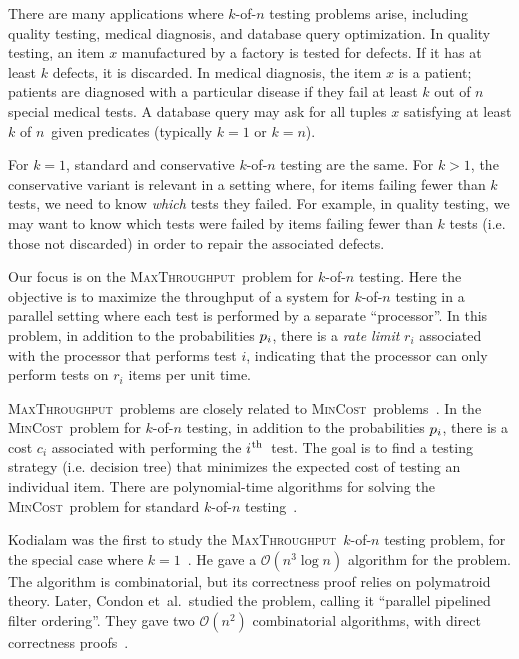 \documentclass{article}
\newcounter{ass}
\newcommand{\ens}[1]{\ensuremath{#1}}					\newcommand{\card}[1]{\ens{|#1|}}							\newcommand{\dotlist}[2]{\ens{#1,\ldots,#2}}
\newcommand{\bigoh}[1]{\ens{\mathcal{O}(#1)}}				\newcommand{\bigom}[1]{\ens{\Omega(#1)}}
\newcommand{\ith}{\ens{i^{\mbox{\hspace{.2mm}\scriptsize th}}}}
\newcommand{\anitem}{\ens{x}}
\newcommand{\valn}{\ens{n}}
\newcommand{\valk}{\ens{k}}
\newcommand{\maxthru}{\textsc{MaxThroughput}}
\newcommand{\mincost}{\textsc{MinCost}}
\newcommand{\kofn}{\valk-of-\valn}
\newcommand{\strategy}{\ens{T}}
\newcommand{\processor}{processor}
\newcommand{\test}[1]{\ens{#1}}										\newcommand{\cost}[1]{\ens{c_{#1}}}								\newcommand{\rate}[1]{\ens{r_{#1}}}								\newcommand{\resrate}[1]{\ens{r'_{#1}}}							\newcommand{\landprob}[2]{\ens{g(#1,#2)}}					\newcommand{\cstrat}[2]{\ens{\strategy^c_{#1}(#2)}}				\newcommand{\sstrat}[2]{\ens{\strategy^s_{#1}(#2)}}				\newcommand{\varz}[1]{\ens{z_{#1}}}								\newcommand{\vary}[1]{\ens{y_{#1}}}
\begin{document}
There are many applications where \kofn{} testing problems
arise, including 
quality testing, medical diagnosis, and database query optimization.
In quality testing, an item \anitem{} manufactured by a factory is tested for defects.  If it has at least $\valk$ defects, it is discarded.  
In medical diagnosis, the item \anitem{} is a patient;
patients are diagnosed with a particular disease if they fail at least
$k$ out of $n$ special medical tests. 
A database query may ask 
for all tuples \anitem{} satisfying at least $\valk$ of \valn\ given predicates (typically $\valk=1$ or $\valk=\valn$).

For $\valk=1$, standard and conservative \kofn{} testing
are the same.
For $\valk>1$, the conservative variant is relevant
in a setting where, for items failing fewer than $\valk$ tests,
we need to know {\em which} tests they failed. 
For example, in quality testing, we may want to know which tests
were failed by items failing fewer than 
$\valk$ tests (i.e. those not discarded)
in order to repair the associated defects.

Our focus is on the \maxthru\ problem 
for \kofn{} testing. 
Here the objective is to maximize the 
throughput of a system for \kofn{} testing in a parallel setting where each
test is performed by a separate ``{\processor}''.
In this problem, in addition to the probabilities $\pr i$, there
is a {\em rate limit} $\rate i$ associated with the {\processor} that performs
test $\test i$, indicating that the
{\processor} can only perform tests on $\rate i$ items per unit time.

\maxthru\ problems are closely related to 
\mincost\ problems~\cite{conf/pods/LiuPRY08,DBLP:journals/talg/DeshpandeH12}.
In the \mincost\ problem for \kofn{} testing, 
in addition to the probabilities $\pr i$,
there is a cost $\cost i$ associated with performing the \ith\ test.
The goal is to find a testing strategy (i.e.
decision tree) that minimizes the expected cost of testing an individual
item.    There are polynomial-time algorithms for solving the
\mincost\ problem for standard \kofn{} testing~\cite{salloumphd,salloumbreuer,bendov81,journals/tc/ChangSF90}.

Kodialam was the first to study the \maxthru\ \kofn{} 
testing problem, for the special case where $\valk=1$~\cite{conf/ipco/Kodialam01}.
He gave a \bigoh{n^3\log n} algorithm for the problem.  The algorithm is
combinatorial, but its correctness proof relies on
polymatroid theory.  
Later, Condon et~al.~studied the problem, calling it 
``parallel pipelined filter ordering''. 
They gave two \bigoh{n^2} combinatorial algorithms, 
with
direct correctness proofs~\cite{journals/talg/CondonDHW09}.
\end{document}
